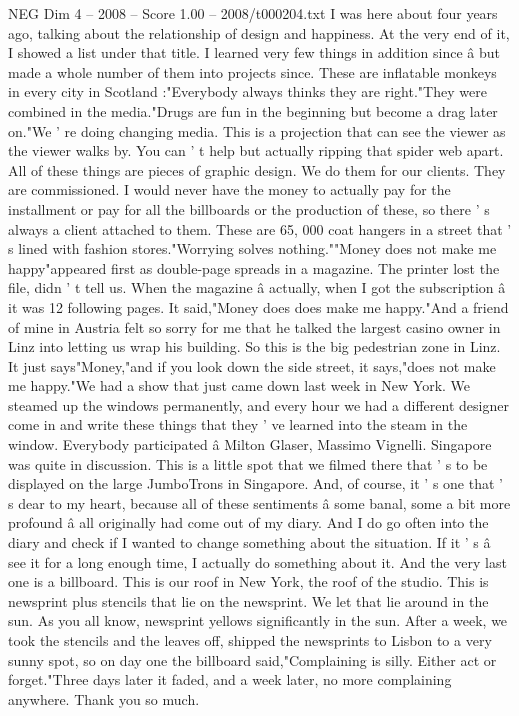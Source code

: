 \begin{textsample}{NEG Dim 4 – 2008 – Score 1.00 – 2008/t000204.txt}  \label{ex:f4_neg_028}
I was here about four years ago, talking about the relationship of design and happiness.
At the very end of it, I showed a list under that title.
I learned very few things in addition since â but made a whole number of them into projects since.
These are inflatable monkeys in every city in Scotland :"Everybody always thinks they are right."They were combined in the media."Drugs are fun in the beginning but become a drag later on."We ' re doing changing media.
This is a projection that can see the viewer as the viewer walks by.
You can ' t help but actually ripping that spider web apart.
All of these things are pieces of graphic design.
We do them for our clients.
They are commissioned.
I would never have the money to actually pay for the installment or pay for all the billboards or the production of these, so there ' s always a client attached to them.
These are 65, 000 coat hangers in a street that ' s lined with fashion stores."Worrying solves nothing.""Money does not make me happy"appeared first as double-page spreads in a magazine.
The printer lost the file, didn ' t tell us.
When the magazine â actually, when I got the subscription â it was 12 following pages.
It said,"Money does does make me happy."And a friend of mine in Austria felt so sorry for me that he talked the largest casino owner in Linz into letting us wrap his building.
So this is the big pedestrian zone in Linz.
It just says"Money,"and if you look down the side street, it says,"does not make me happy."We had a show that just came down last week in New York.
We steamed up the windows permanently, and every hour we had a different designer come in and write these things that they ' ve learned into the steam in the window.
Everybody participated â Milton Glaser, Massimo Vignelli.
Singapore was quite in discussion.
This is a little spot that we filmed there that ' s to be displayed on the large JumboTrons in Singapore.
And, of course, it ' s one that ' s dear to my heart, because all of these sentiments â some banal, some a bit more profound â all originally had come out of my diary.
And I do go often into the diary and check if I wanted to change something about the situation.
If it ' s â see it for a long enough time, I actually do something about it.
And the very last one is a billboard.
This is our roof in New York, the roof of the studio.
This is newsprint plus stencils that lie on the newsprint.
We let that lie around in the sun.
As you all know, newsprint yellows significantly in the sun.
After a week, we took the stencils and the leaves off, shipped the newsprints to Lisbon to a very sunny spot, so on day one the billboard said,"Complaining is silly.
Either act or forget."Three days later it faded, and a week later, no more complaining anywhere.
Thank you so much.

\end{textsample}
